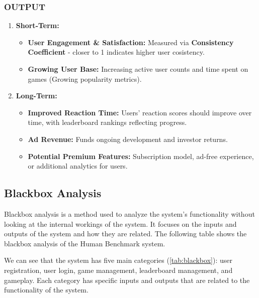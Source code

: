 \documentclass[]{VUMIFTemplateClass}
\begin{document}
\subsubsection{OUTPUT}
\begin{enumerate}
    \item \textbf{Short-Term:}
    \begin{itemize}
        \item \textbf{User Engagement \& Satisfaction:} Measured via \textbf{Consistency Coefficient} - closer to 1 indicates higher user cosistency.
        \item \textbf{Growing User Base:} Increasing active user counts and time spent on games (Growing popularity metrics).
    \end{itemize}
    \item \textbf{Long-Term:}
    \begin{itemize}
        \item \textbf{Improved Reaction Time:} Users' reaction scores should improve over time, with leaderboard rankings reflecting progress.
        \item \textbf{Ad Revenue:} Funds ongoing development and investor returns.
        \item \textbf{Potential Premium Features:} Subscription model, ad-free experience, or additional analytics for users.
    \end{itemize}
\end{enumerate}



\subsection{Blackbox Analysis}
Blackbox analysis is a method used to analyze the system's functionality without looking at the internal workings of the system. It focuses on the inputs and outputs of the system and how they are related. The following table shows the blackbox analysis of the Human Benchmark system.

We can see that the system has five main categories (\ref{tab:blackbox}): user registration, user login, game management, leaderboard management, and gameplay. Each category has specific inputs and outputs that are related to the functionality of the system.
\end{document}
